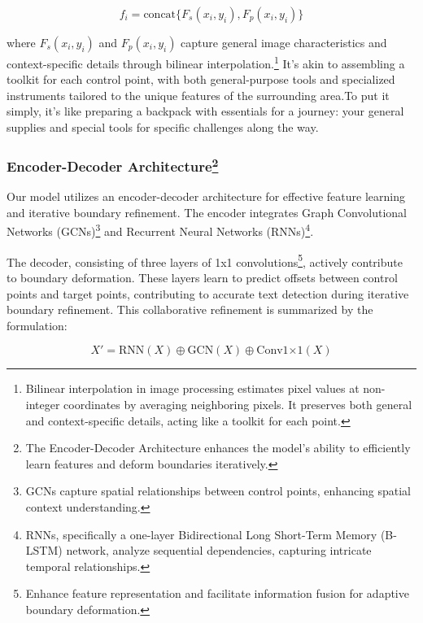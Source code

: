 \documentclass[default,iicol]{sn-jnl}%
\begin{document}
\begin{equation}
	f_i = \text{concat}\{F_s(x_i, y_i), F_p(x_i, y_i)\}
\end{equation}

where $F_s(x_i, y_i)$ and $F_p(x_i, y_i)$ capture general image characteristics and context-specific details through bilinear interpolation.\protect\footnote{Bilinear interpolation in image processing estimates pixel values at non-integer coordinates by averaging neighboring pixels. It preserves both general and context-specific details, acting like a toolkit for each point.} It's akin to assembling a toolkit for each control point, with both general-purpose tools and specialized instruments tailored to the unique features of the surrounding area.To put it simply, it's like preparing a backpack with essentials for a journey: your general supplies and special tools for specific challenges along the way.

\subsubsection*{Encoder-Decoder Architecture\protect\footnote{The Encoder-Decoder Architecture enhances the model's ability to efficiently learn features and deform boundaries iteratively.}}

Our model utilizes an encoder-decoder architecture for effective feature learning and iterative boundary refinement. The encoder integrates Graph Convolutional Networks (GCNs)\protect\footnote{GCNs capture spatial relationships between control points, enhancing spatial context understanding.} and Recurrent Neural Networks (RNNs)\protect\footnote{RNNs, specifically a one-layer Bidirectional Long Short-Term Memory (B-LSTM) network, analyze sequential dependencies, capturing intricate temporal relationships.}.

The decoder, consisting of three layers of 1x1 convolutions\protect\footnote{Enhance feature representation and facilitate information fusion for adaptive boundary deformation.}, actively contribute to boundary deformation. These layers learn to predict offsets between control points and target points, contributing to accurate text detection during iterative boundary refinement. This collaborative refinement is summarized by the formulation:

\begin{equation}
	X' = \text{{RNN}}(X) \oplus \text{{GCN}}(X) \oplus \text{{Conv1×1}}(X)
\end{equation}
\end{document}
